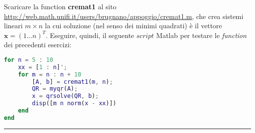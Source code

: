 Scaricare la function \textbf{cremat1} al sito
\url{http://web.math.unifi.it/users/brugnano/appoggio/cremat1.m},
che crea sistemi lineari $m \times n$ la cui soluzione (nel senso dei minimi quadrati) è il vettore $\textbf{x}=(1 \dots n)^{T}$.
Eseguire, quindi, il seguente $script$ Matlab per testare le \textit{function} dei precedenti esercizi:
\begin{lstlisting}[language=Matlab]
for n = 5 : 10
	xx = [1 : n]';
	for m = n : n + 10
		[A, b] = cremat1(m, n);
		QR = myqr(A);
		x = qrsolve(QR, b);
		disp([m n norm(x - xx)])
	end
end
\end{lstlisting}

\hspace*{\fill}
\par\noindent\rule{\textwidth}{0.4pt}
\hspace*{\fill}

